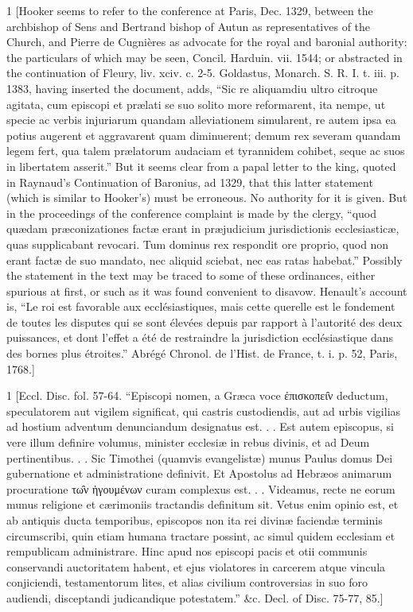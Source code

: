 1
[Hooker seems to refer to the conference at Paris, Dec. 1329, between the archbishop of Sens and Bertrand bishop of Autun as representatives of the Church, and Pierre de Cugnières as advocate for the royal and baronial authority: the particulars of which may be seen, Concil. Harduin. vii. 1544; or abstracted in the continuation of Fleury, liv. xciv. c. 2-5. Goldastus, Monarch. S. R. I. t. iii. p. 1383, having inserted the document, adds, “Sic re aliquamdiu ultro citroque agitata, cum episcopi et prælati se suo solito more reformarent, ita nempe, ut specie ac verbis injuriarum quandam alleviationem simularent, re autem ipsa ea potius augerent et aggravarent quam diminuerent; demum rex severam quandam legem fert, qua talem prælatorum audaciam et tyrannidem cohibet, seque ac suos in libertatem asserit.” But it seems clear from a papal letter to the king, quoted in Raynaud’s Continuation of Baronius, ad 1329, that this latter statement (which is similar to Hooker’s) must be erroneous. No authority for it is given. But in the proceedings of the conference complaint is made by the clergy, “quod quædam præconizationes factæ erant in præjudicium jurisdictionis ecclesiasticæ, quas supplicabant revocari. Tum dominus rex respondit ore proprio, quod non erant factæ de suo mandato, nec aliquid sciebat, nec eas ratas habebat.” Possibly the statement in the text may be traced to some of these ordinances, either spurious at first, or such as it was found convenient to disavow. Henault’s account is, “Le roi est favorable aux ecclésiastiques, mais cette querelle est le fondement de toutes les disputes qui se sont élevées depuis par rapport à l’autorité des deux puissances, et dont l’effet a été de restraindre la jurisdiction ecclésiastique dans des bornes plus étroites.” Abrégé Chronol. de l’Hist. de France, t. i. p. 52, Paris, 1768.]

1
[Eccl. Disc. fol. 57-64. “Episcopi nomen, a Græca voce ἐπισκοπει̑ν deductum, speculatorem aut vigilem significat, qui castris custodiendis, aut ad urbis vigilias ad hostium adventum denunciandum designatus est. . . Est autem episcopus, si vere illum definire volumus, minister ecclesiæ in rebus divinis, et ad Deum pertinentibus. . . Sic Timothei (quamvis evangelistæ) munus Paulus domus Dei gubernatione et administratione definivit. Et Apostolus ad Hebræos animarum procuratione τω̑ν ἡγουμένων curam complexus est. . . Videamus, recte ne eorum munus religione et cærimoniis tractandis definitum sit. Vetus enim opinio est, et ab antiquis ducta temporibus, episcopos non ita rei divinæ faciendæ terminis circumscribi, quin etiam humana tractare possint, ac simul quidem ecclesiam et rempublicam administrare. Hinc apud nos episcopi pacis et otii communis conservandi auctoritatem habent, et ejus violatores in carcerem atque vincula conjiciendi, testamentorum lites, et alias civilium controversias in suo foro audiendi, disceptandi judicandique potestatem.” &c. Decl. of Disc. 75-77, 85.]

